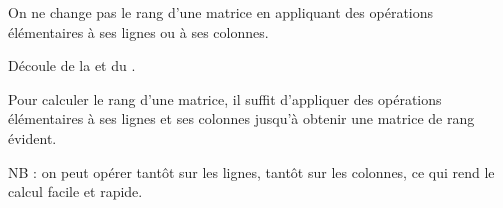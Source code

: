 \begin{lem}
On ne change pas le rang d'une matrice en appliquant des opérations élémentaires à ses lignes ou à ses colonnes.
\end{lem}

\begin{dem}
Découle de la  et du .
\end{dem}

\begin{algo}
Pour calculer le rang d'une matrice, il suffit d'appliquer des opérations élémentaires à ses lignes et ses colonnes jusqu'à obtenir une matrice de rang évident.

NB : on peut opérer tantôt sur les lignes, tantôt sur les colonnes, ce qui rend le calcul facile et rapide.
\end{algo}

